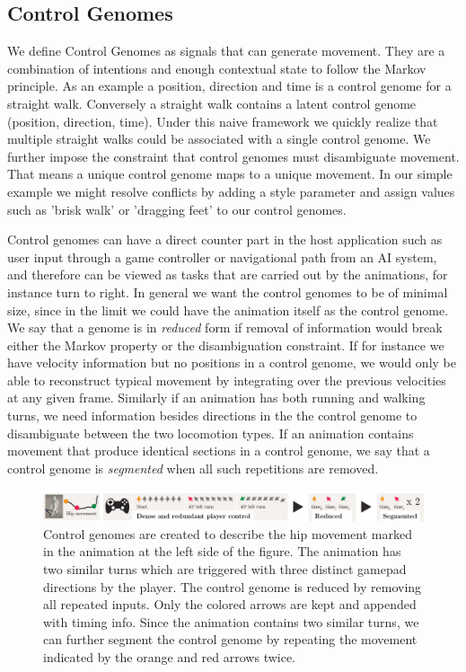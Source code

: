 \subsection{Control Genomes}
We define Control Genomes as signals that can generate movement. They are a combination of intentions and enough contextual state to follow the Markov principle. As an example a position, direction and time is a control genome for a straight walk. Conversely a straight walk contains a latent control genome (position, direction, time). Under this naive framework we quickly realize that multiple straight walks could be associated with a single control genome. We further impose the constraint that control genomes must disambiguate movement. That means a unique control genome maps to a unique movement. In our simple example we might resolve conflicts by adding a style parameter and assign values such as 'brisk walk' or 'dragging feet' to our control genomes. 

Control genomes can have a direct counter part in the host application such as user input through a game controller or navigational path from an AI system, and therefore can be viewed as tasks that are carried out by the animations, for instance turn to right. In general we want the control genomes to be of minimal size, since in the limit we could have the animation itself as the control genome. We say that a genome is in \textit{reduced} form if removal of information would break either the Markov property or the disambiguation constraint. If for instance we have velocity information but no positions in a control genome, we would only be able to reconstruct typical movement by integrating over the previous velocities at any given frame. Similarly if an animation has both running and walking turns, we need information besides directions in the the control genome to disambiguate between the two locomotion types. If an animation contains movement that produce identical sections in a control genome, we say that a control genome is \textit{segmented} when all such repetitions are removed.
\begin{figure}
    \centering
    \includegraphics[width=1\columnwidth]{img/controlgenome.png}
    \caption{Control genomes are created to describe the hip movement marked in the animation at the left side of the figure. The animation has two similar turns which are triggered with three distinct gamepad directions by the player. The control genome is reduced by removing all repeated inputs. Only the colored arrows are kept and appended with timing info. Since the animation contains two similar turns, we can further segment the control genome by repeating the movement indicated by the orange and red arrows twice. }
    \label{fig:control:genome}
\end{figure}


